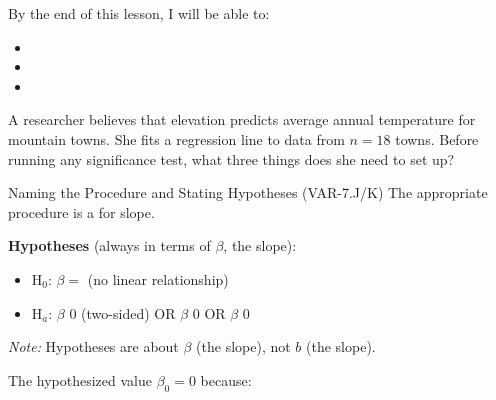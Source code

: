 \documentclass[10pt]{article}
\begin{document}
\namedateperiod

\begin{objectivebox}
By the end of this lesson, I will be able to:
\begin{itemize}
    \item[$\square$] \writeline
    \item[$\square$] \writeline
    \item[$\square$] \writeline
\end{itemize}
\end{objectivebox}

\begin{vocabbox}
\end{vocabbox}

\begin{hookbox}
A researcher believes that elevation predicts average annual temperature for mountain
towns. She fits a regression line to data from $n = 18$ towns. Before running any
significance test, what three things does she need to set up?

\end{hookbox}

\begin{notesbox}{Naming the Procedure and Stating Hypotheses (VAR-7.J/K)}
The appropriate procedure is a \blank{4cm} for slope.

\vspace{0.1in}
\textbf{Hypotheses} (always in terms of $\beta$, the \blank{6cm} slope):

\begin{itemize}
    \item H$_0$: $\beta = $ \blank{1.5cm} \quad (no linear relationship)
    \item H$_a$: $\beta$ \blank{1.5cm} 0 \; (two-sided) \quad OR \quad
          $\beta$ \blank{1.5cm} 0 \quad OR \quad $\beta$ \blank{1.5cm} 0
\end{itemize}

\vspace{0.05in}
\textit{Note:} Hypotheses are about $\beta$ (the \blank{6cm} slope),
not $b$ (the \blank{6cm} slope).

\vspace{0.05in}
The hypothesized value $\beta_0 = 0$ because: \writeline
\end{notesbox}
\end{document}

